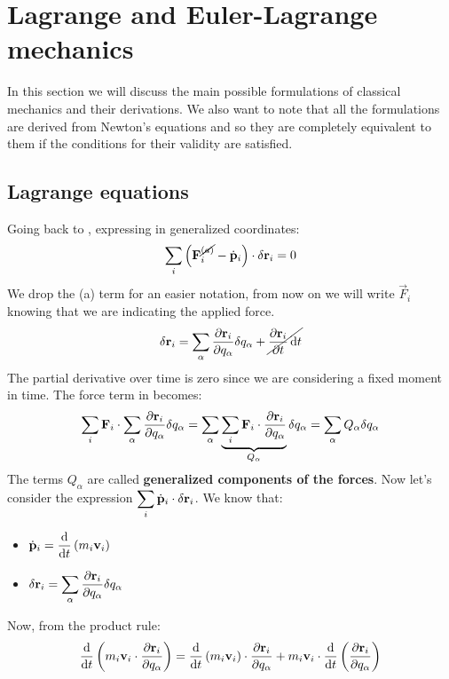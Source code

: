 \chapter[Lagrangian Mechanics]{Lagrange and Euler-Lagrange mechanics}
In this section we will discuss the main possible formulations of classical mechanics and their derivations. We also want to note that all the formulations are derived from Newton's equations and so they are completely equivalent to them if the conditions for their validity are satisfied.
\section{Lagrange equations}
Going back to \dalembertref, expressing in generalized coordinates:
\begin{equation}
    \displaystyle\sum_i \left(\vb{F}^{\cancel{(a)}}_i - \dot{\vb{p}}_i\right) \cdot \delta \vb{r}_i = 0
\end{equation}
We drop the (a) term for an easier notation, from now on we will write $\vec{F}_i$ knowing that we are indicating the applied force.
\begin{equation}
    \delta \vb{r}_i = \displaystyle\sum_{\alpha} \dfrac{\partial \vb{r}_i}{\partial q_{\alpha}} \delta q_{\alpha} + \cancel{\dfrac{\partial \vb{r}_i}{\partial t} \dd{t}}
\end{equation}
The partial derivative over time is zero since we are considering a fixed moment in time. The force term in \dalembertref\;becomes:
\begin{equation}
    \displaystyle\sum_i \vb{F}_i \cdot \displaystyle\sum_{\alpha} \dfrac{\partial \vb{r}_i}{\partial q_{\alpha}} \delta q_{\alpha} = \displaystyle\sum_{\alpha}\underbrace{\displaystyle\sum_{i} \vb{F}_i \cdot \dfrac{\partial \vb{r}_i}{\partial q_{\alpha}}}_{Q_{\alpha}} \delta q_{\alpha} = \displaystyle\sum_{\alpha}Q_{\alpha}\delta q_{\alpha}
\end{equation}
The terms $Q_{\alpha}$ are called \textbf{generalized components of the forces}.
Now let's consider the expression $\displaystyle\sum_i \dot{\vb{p}}_i \cdot \delta \vb{r}_i$. We know that:
\begin{itemize}
    \item $\dvec{p}_i = \dv{}{t}\brackets{m_i\vec{v}_i}$
    \item $\delta \vb{r}_i = \displaystyle\sum_{\alpha} \dfrac{\partial \vb{r}_i}{\partial q_{\alpha}}\delta q_{\alpha}$
\end{itemize}
Now, from the product rule:
\begin{equation} \label{e:total_deriv}
    \dv{}{t}\brackets{m_i\vec{v}_i \cdot \dfrac{\partial \vec{r}_i}{\partial q_{\alpha}}} = \dv{}{t}\brackets{m_i\vec{v}_i}\cdot \dfrac{\partial \vec{r}_i}{\partial q_{\alpha}} + m_i\vec{v}_i \cdot \dv{}{t}\brackets{\dfrac{\partial \vec{r}_i}{\partial q_{\alpha}}}
\end{equation}
